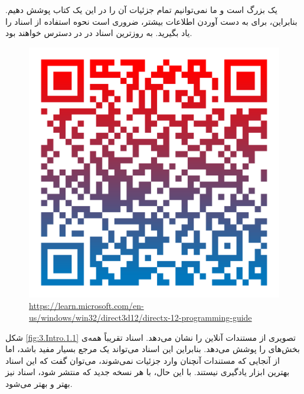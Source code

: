 {
    \Large
    \begin{spacing}{1.5}
         یک  بزرگ است و ما نمی‌توانیم تمام جزئیات آن را در این یک کتاب پوشش دهیم.
        بنابراین، برای به دست آوردن اطلاعات بیشتر، ضروری است نحوه استفاده از اسناد  را یاد بگیرید.
        به روزترین اسناد در  در دسترس خواهند بود.

        \begin{figure}[H]
            \centering
            \setlength{\belowcaptionskip}{-10pt}
            \includegraphics[scale=0.15]{Images/3/3.Intro.0.2}
            \caption*{\normalsize \url{https://learn.microsoft.com/en-us/windows/win32/direct3d12/directx-12-programming-guide}}
            \label{fig:learn.microsoft.com}
        \end{figure}

        شکل \ref{fig:3.Intro.1.1} تصویری از مستندات آنلاین را نشان می‌دهد.
        اسناد  تقریباً همه‌ی بخش‌های  را پوشش می‌دهد.
        بنابراین این اسناد می‌تواند یک مرجع بسیار مفید باشد، اما از آنجایی که مستندات آنچنان وارد جزئیات نمی‌شوند، می‌توان گفت که این اسناد بهترین ابزار یادگیری نیستند. با این حال، با هر نسخه جدید  که منتشر شود، اسناد نیز بهتر و بهتر می‌شود.


\end{spacing}}
